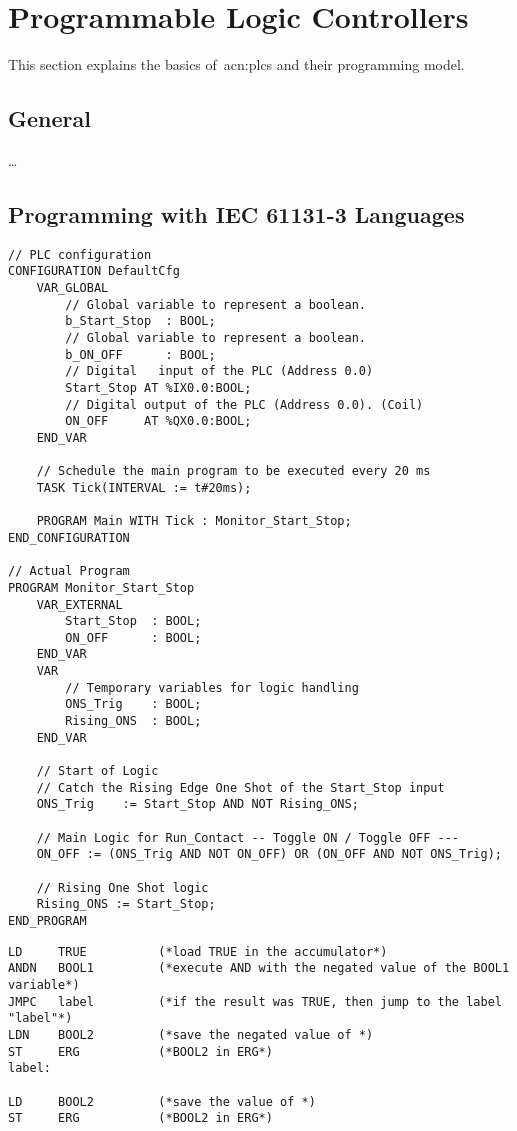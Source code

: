 \section{Programmable Logic Controllers}
\label{sec:plc}

This section explains the basics of~\glspl{acn:plc} and their programming model.

\subsection{General}

\dots

\subsection{Programming with IEC 61131-3 Languages}

\lstset{language=Pascal}
\begin{lstlisting}[caption={Example of~\gls{acn:ST} code. Source:~\cite{Wiki:ST}},label=lst:ex:st]
// PLC configuration
CONFIGURATION DefaultCfg
	VAR_GLOBAL
		// Global variable to represent a boolean.
		b_Start_Stop  : BOOL;
		// Global variable to represent a boolean.
		b_ON_OFF      : BOOL;
		// Digital   input of the PLC (Address 0.0)
		Start_Stop AT %IX0.0:BOOL;
		// Digital output of the PLC (Address 0.0). (Coil)
		ON_OFF     AT %QX0.0:BOOL;
	END_VAR

	// Schedule the main program to be executed every 20 ms
	TASK Tick(INTERVAL := t#20ms);

	PROGRAM Main WITH Tick : Monitor_Start_Stop;
END_CONFIGURATION

// Actual Program
PROGRAM Monitor_Start_Stop          
	VAR_EXTERNAL
		Start_Stop  : BOOL;
		ON_OFF      : BOOL;
	END_VAR
	VAR
		// Temporary variables for logic handling     
		ONS_Trig    : BOOL;
		Rising_ONS  : BOOL;
	END_VAR

	// Start of Logic
	// Catch the Rising Edge One Shot of the Start_Stop input
	ONS_Trig    := Start_Stop AND NOT Rising_ONS;

	// Main Logic for Run_Contact -- Toggle ON / Toggle OFF ---
	ON_OFF := (ONS_Trig AND NOT ON_OFF) OR (ON_OFF AND NOT ONS_Trig);

	// Rising One Shot logic   
	Rising_ONS := Start_Stop;
END_PROGRAM
\end{lstlisting}

\lstset{language=[x86masm]Assembler}
\begin{lstlisting}[caption={Example of~\gls{acn:IL} code. Source:~\cite{Beckhoff:IL}},label=lst:ex:il]
LD     TRUE          (*load TRUE in the accumulator*)
ANDN   BOOL1         (*execute AND with the negated value of the BOOL1 variable*)
JMPC   label         (*if the result was TRUE, then jump to the label "label"*)
LDN    BOOL2         (*save the negated value of *)
ST     ERG           (*BOOL2 in ERG*)
label:

LD     BOOL2         (*save the value of *)
ST     ERG           (*BOOL2 in ERG*)
\end{lstlisting}